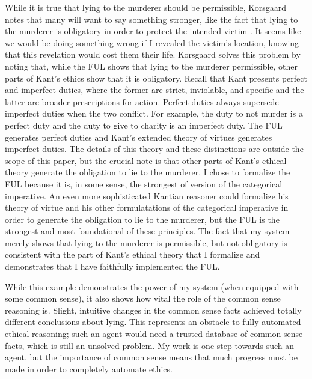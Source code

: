 \begin{isabellebody}
\begin{isamarkuptext}
While it is true that lying to the murderer should be permissible, Korsgaard notes that many will want
to say something stronger, like the fact that lying to the murderer is obligatory in order to protect
the intended victim \citep[15]{KorsgaardRTL}. It seems like we would be doing something wrong if I revealed the victim's
location, knowing that this revelation would cost them their life. Korsgaard solves this problem by 
noting that, while the FUL shows that lying to the murderer permissible, other parts of Kant's ethics
show that it is obligatory. Recall that Kant presents perfect and imperfect duties,
where the former are strict, inviolable, and specific and the latter are broader prescriptions for action.
Perfect duties always supersede imperfect duties when the two conflict.
For example, the duty to not murder is a perfect duty and the duty to give to charity is an imperfect duty. 
The FUL generates perfect duties and Kant's extended theory of virtues generates imperfect duties. The details
of this theory and these distinctions are outside the scope of this paper, but the crucial note is that 
other parts of Kant's ethical theory generate the obligation to lie to the murderer. I chose
to formalize the FUL because it is, in some sense, the strongest of version of the categorical
imperative. An even more sophisticated Kantian reasoner could formalize his theory of virtue and his
other formulatations of the categorical imperative in order to generate the obligation to lie to the murderer, 
but the FUL is the strongest and most foundational of these principles. The fact that my system merely
shows that lying to the murderer is permissible, but not obligatory is consistent with the part of 
Kant's ethical theory that I formalize and demonstrates that I have faithfully implemented the FUL.%
\end{isamarkuptext}\isamarkuptrue%
%
\begin{isamarkuptext}%
While this example demonstrates the power of my system (when equipped with some common sense), it 
also shows how vital the role of the common sense reasoning is. Slight, intuitive changes in the common
sense facts achieved totally different conclusions about lying. This represents an obstacle to 
fully automated ethical reasoning; such an agent would need a trusted database of common 
sense facts, which is still an unsolved problem. My work is one step towards such an agent, but the 
importance of common sense means that much progress must be made in order to completely automate ethics.


\end{isamarkuptext}
\end{isabellebody}
